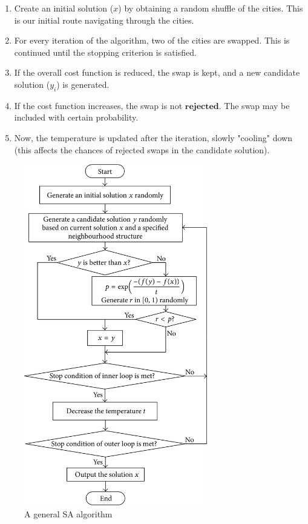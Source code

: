 \documentclass[conference]{IEEEtran}
\begin{document}
\begin{enumerate}
    \item Create an initial solution ($x$) by obtaining a random shuffle of the cities. This is our initial route navigating through the cities. 
    \item For every iteration of the algorithm, two of the cities are swapped. This is continued until the stopping criterion is satisfied.
    \item If the overall cost function is reduced, the swap is kept, and a new candidate solution ($y_i$) is generated. 
    \item If the cost function increases, the swap is not $\textbf{rejected}$. The swap may be included with certain probability. 
    \item Now, the temperature is updated after the iteration, slowly "cooling" down (this affects the chances of rejected swaps in the candidate solution).
\end{enumerate}

\begin{figure}[htp]
    \includegraphics[width=8cm]{SA_flowchart}
    \caption{A general SA algorithm}
    \label{fig : General steps for a Simulated Annealing algorithm}
\end{figure}
\end{document}
